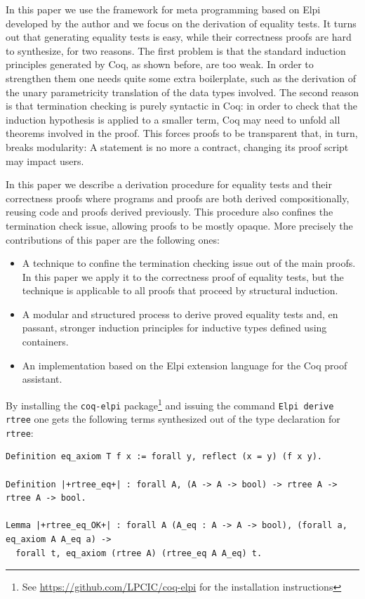 \documentclass[a4paper,UKenglish,cleveref, autoref]{lipics-v2019}
\begin{document}
In this paper we use the framework for meta programming based on
Elpi~\cite{dunchev:hal-01176856,tassi:hal-01637063} developed by the
author and we focus on the derivation of equality tests.
It turns out that generating equality tests is easy,
while their correctness proofs are hard to synthesize, for two reasons. 
The first problem is that 
the standard induction principles generated by Coq, as shown
before, are too weak. In order to strengthen them one needs quite some extra
boilerplate, such as the derivation of the unary parametricity
translation of the data types involved.
The second reason is that termination checking
is purely syntactic in Coq: %
in order to check that the induction
hypothesis is applied to a smaller term, Coq may need to unfold all
theorems involved in the proof. This forces proofs to
be transparent that, in turn, breaks modularity: A statement is no more a
contract, changing its proof script may impact users.

In this paper we describe a derivation procedure for equality tests
and their correctness proofs
where programs and proofs are both
derived compositionally, reusing code and proofs derived previously.
This procedure also confines the termination check issue,
allowing proofs to be mostly opaque.
More precisely the contributions of this paper are the following ones:
\begin{itemize}
\item A technique to confine the termination checking issue out of the
	main proofs. In this paper we apply it to the correctness
	proof of equality
	tests, but the technique is applicable to all proofs 
	that proceed by structural
	induction.

\item A modular and structured process to derive proved equality tests
		and, en passant, stronger
	induction principles for inductive types defined using
	containers.

\item An implementation based on the Elpi extension language
	for the Coq proof assistant.
\end{itemize}

\noindent
By installing the \lstinline+coq-elpi+
package\footnote{See \url{https://github.com/LPCIC/coq-elpi} for the
installation instructions} 
and issuing the command \lstinline+Elpi derive rtree+
one gets the following terms synthesized
out of the type declaration for \lstinline+rtree+:

\begin{lstlisting}
Definition eq_axiom T f x := forall y, reflect (x = y) (f x y).

Definition |+rtree_eq+| : forall A, (A -> A -> bool) -> rtree A -> rtree A -> bool.

Lemma |+rtree_eq_OK+| : forall A (A_eq : A -> A -> bool), (forall a, eq_axiom A A_eq a) ->
  forall t, eq_axiom (rtree A) (rtree_eq A A_eq) t.
\end{lstlisting}
\end{document}
